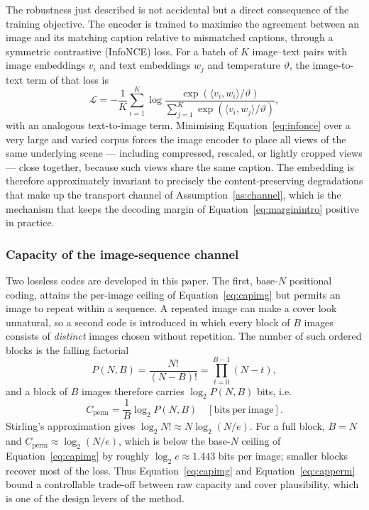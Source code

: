 \documentclass[10pt,a4paper]{article}
\theoremstyle{definition}
\begin{document}
The robustness just described is not accidental but a direct consequence of the
training objective. The encoder is trained to maximise the agreement between an
image and its matching caption relative to mismatched captions, through a symmetric
contrastive (InfoNCE) loss. For a batch of $K$ image--text pairs with image
embeddings $v_i$ and text embeddings $w_j$ and temperature $\vartheta$, the
image-to-text term of that loss is
\begin{equation}
  \mathcal{L}=-\frac{1}{K}\sum_{i=1}^{K}\log
      \frac{\exp\!\left(\langle v_i,w_i\rangle/\vartheta\right)}
           {\sum_{j=1}^{K}\exp\!\left(\langle v_i,w_j\rangle/\vartheta\right)},
  \label{eq:infonce}
\end{equation}
with an analogous text-to-image term. Minimising Equation~\eqref{eq:infonce} over a very large
and varied corpus forces the image encoder to place all views of the same
underlying scene --- including compressed, rescaled, or lightly cropped views ---
close together, because such views share the same caption. The embedding is
therefore approximately invariant to precisely the content-preserving degradations
that make up the transport channel of Assumption~\ref{as:channel}, which is the
mechanism that keeps the decoding margin of Equation~\eqref{eq:marginintro} positive in
practice.

\subsubsection{Capacity of the image-sequence channel}\label{sec:capacity}
Two lossless codes are developed in this paper. The first, base-$N$ positional
coding, attains the per-image ceiling of Equation~\eqref{eq:capimg} but permits an image to
repeat within a sequence. A repeated image can make a cover look unnatural, so a
second code is introduced in which every block of $B$ images consists of
\emph{distinct} images chosen without repetition. The number of such ordered
blocks is the falling factorial
\begin{equation}
  P(N,B)=\frac{N!}{(N-B)!}=\prod_{t=0}^{B-1}(N-t),
  \label{eq:pnb}
\end{equation}
and a block of $B$ images therefore carries $\log_2 P(N,B)$ bits, i.e.
\begin{equation}
  C_{\text{perm}}=\frac{1}{B}\log_2 P(N,B)\quad[\mathrm{bits\ per\ image}].
  \label{eq:capperm}
\end{equation}
Stirling's approximation gives $\log_2 N!\approx N\log_2(N/e)$. For a full
block, $B=N$ and $C_{\text{perm}}\approx\log_2(N/e)$, which is below the
base-$N$ ceiling of Equation~\eqref{eq:capimg} by roughly $\log_2 e\approx 1.443$ bits per
image; smaller blocks recover most of the loss. Thus Equation~\eqref{eq:capimg} and
Equation~\eqref{eq:capperm} bound a controllable trade-off between raw capacity and cover
plausibility, which is one of the design levers of the method.
\end{document}
